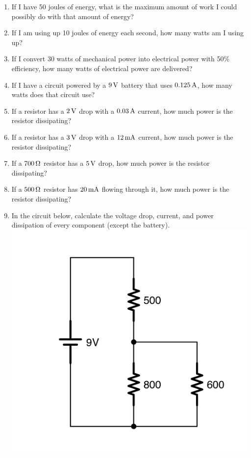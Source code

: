 \begin{enumerate}
\item If I have 50 joules of energy, what is the maximum amount of work I could possibly do with that amount of energy?
\item If I am using up 10 joules of energy each second, how many watts am I using up?
\item If I convert 30 watts of mechanical power into electrical power with 50\% efficiency, how many watts of electrical power are delivered?
\item If I have a circuit powered by a $9\,\si{\volt}$ battery that uses $0.125\,\si{\ampere}$, how many watts does that circuit use?
\item If a resistor has a $2\,\si{\volt}$ drop with a $0.03\,\si{\ampere}$ current, how much power is the resistor dissipating?
\item If a resistor has a $3\,\si{\volt}$ drop with a $12\,\si{\milli\ampere}$ current, how much power is the resistor dissipating?
\item If a $700\,\si{\ohm}$ resistor has a $5\,\si{\volt}$ drop, how much power is the resistor dissipating?
\item If a $500\,\si{\ohm}$ resistor has $20\,\si{\milli\ampere}$ flowing through it, how much power is the resistor dissipating?
\item In the circuit below, calculate the voltage drop, current, and power dissipation of every component (except the battery). \\ \includegraphics[scale=0.08]{ExampleForPowerDissipation.png}
\end{enumerate}
